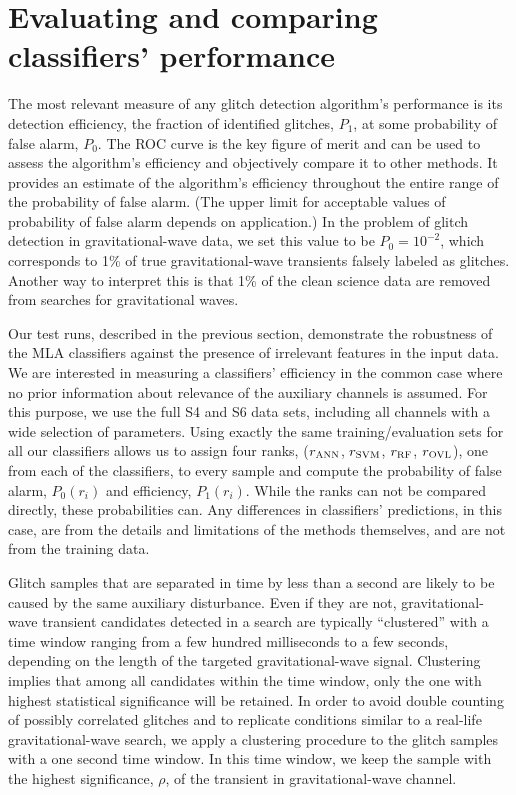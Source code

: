\documentclass[prd, twocolumn, lengthcheck, superscriptaddress, showpacs, letterpaper, nofootinbib]{revtex4-1}
\newcommand\ANNrank{r_{\textsc{ANN}}}
\newcommand\SVMrank{r_{\textsc{SVM}}}
\newcommand\RFrank{r_{\textsc{RF}}}
\newcommand\OVLrank{r_{\textsc{OVL}}}
\begin{document}
 
\section{Evaluating and comparing classifiers' performance}
\label{comparison}

The most relevant measure of any glitch detection algorithm's performance is its detection efficiency, the fraction of  identified glitches, $P_{1}$, at some probability of false alarm, $P_{0}$. The \ac{ROC} curve is the key figure of merit and can be used to assess the algorithm's efficiency and objectively compare it to other methods. It provides an estimate of the algorithm's efficiency throughout the entire range of the probability of false alarm. (The upper limit for acceptable values of probability of false alarm depends on application.) In the problem of glitch detection in gravitational-wave data, we set this value to be  $P_{0}=10^{-2}$, which corresponds to 1\% of true gravitational-wave transients falsely labeled as glitches. Another way to interpret this is that 1\% of the clean science data are removed from searches for gravitational waves. 

Our test runs, described in the previous section, demonstrate the robustness of
the \ac{MLA} classifiers against the presence of irrelevant features in the
input data. We are interested in measuring a classifiers' efficiency in the
common case where no prior information about relevance of the auxiliary
channels is assumed. For this purpose, we use the full S4 and S6 data sets,
including all channels with a wide selection of parameters. Using exactly
the same training/evaluation sets for all our classifiers allows us to assign
four ranks, ($\ANNrank$, $\SVMrank$, $\RFrank$, $\OVLrank$), one from each of
the classifiers, to every sample and compute the probability of false alarm,
$P_{0}(r_i)$ and efficiency, $P_{1}(r_i)$. While the ranks can not be compared
directly, these probabilities can. Any differences in classifiers' predictions,
in this case, are from the details and limitations of the methods themselves,
and are not from the training data.

 Glitch samples that are separated in time by less than a second are likely to be caused by the same auxiliary disturbance. Even if they are not, gravitational-wave transient candidates detected in a search are typically ``clustered'' with a time window ranging from a few hundred milliseconds to a few seconds, depending on the length of the targeted gravitational-wave signal. Clustering  implies that among all candidates within the time window, only the one with highest statistical significance will be retained. In order to avoid double counting of possibly correlated glitches and to replicate conditions similar to a real-life gravitational-wave search, we apply a clustering procedure to the glitch samples with a one second time window. In this time window, we keep the sample with the highest significance, $\rho$, of the transient in gravitational-wave channel. 
\end{document}
